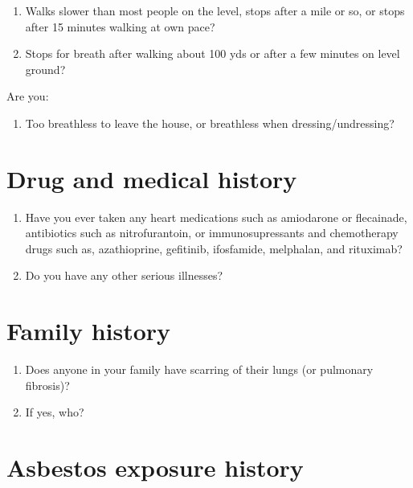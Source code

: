 \documentclass[a4paper,10pt]{article}
\begin{document}
\begin{enumerate}[resume]
\item Walks slower than most people on the level, stops after a mile or so, or stops after 15 minutes walking at own pace?
\item Stops for breath after walking about 100 yds or after a few minutes on level ground?
\end{enumerate}

Are you:

\begin{enumerate}[resume]
\item Too breathless to leave the house, or breathless when dressing/undressing?
\end{enumerate}

\section{Drug and medical history}

\begin{enumerate}
\item Have you ever taken any heart medications such as amiodarone or flecainade, antibiotics such as nitrofurantoin, or immunosupressants and chemotherapy drugs such as, azathioprine, gefitinib, ifosfamide, melphalan, and rituximab? %
\item Do you have any other serious illnesses?
\end{enumerate}

\section{Family history}

\begin{enumerate}
    \item Does anyone in your family have scarring of their lungs (or pulmonary fibrosis)? 
\item If yes, who? 
\end{enumerate}

\section{Asbestos exposure history}
\end{document}
